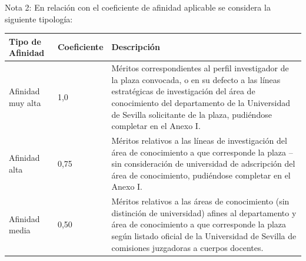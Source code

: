 \documentclass{article}
\begin{document}
\begin{itemize}
\begin{itemize}
\begin{scriptsize}
                  Nota 2: En relación con el coeficiente de afinidad aplicable se considera la siguiente tipología:

                  \vspace{0.4cm}
                  \begin{table}[h!]\centering\renewcommand{\arraystretch}{1.3}
                    \begin{tabular}{|p{}|p{}|p{}|}\hline
                      Tipo de Afinidad         & Coeficiente & Descripción                                                                                                                                                                                                                                                                                                                                                                                                                                                   \\\hline
                      Afinidad muy alta        & 1,0         & Méritos correspondientes al perfil investigador de la plaza convocada, o en su defecto a las líneas estratégicas de investigación del área de conocimiento del departamento de la Universidad de Sevilla solicitante de la plaza, pudiéndose completar en el Anexo I.                                                                                                                                                                                         \\\hline
                      Afinidad alta            & 0,75        & Méritos relativos a las líneas de investigación del área de conocimiento a que corresponde la plaza –sin consideración de universidad de adscripción del área de conocimiento, pudiéndose completar en el Anexo I.                                                                                                                                                                                                                                            \\\hline
                      Afinidad media           & 0,50        & Méritos relativos a las áreas de conocimiento (sin distinción de universidad) afines al departamento y área de conocimiento a que corresponde la plaza según listado oficial de la Universidad de Sevilla de comisiones juzgadoras a cuerpos docentes.                                                                                                                                                                                                        \\\hline

\end{tabular}
\end{table}
\end{scriptsize}
\end{itemize}
\end{itemize}
\end{document}
